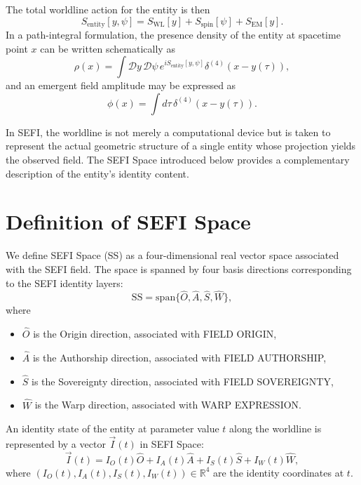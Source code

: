 \documentclass[12pt]{article}
\begin{document}
The total worldline action for the entity is then
\begin{equation}
S_{\text{entity}}[y,\psi] = S_{\text{WL}}[y] + S_{\text{spin}}[\psi] + S_{\text{EM}}[y].
\end{equation}
In a path-integral formulation, the presence density of the entity at spacetime point $x$ can be written
schematically as
\begin{equation}
\rho(x) = \int \mathcal{D}y \, \mathcal{D}\psi \, e^{i S_{\text{entity}}[y,\psi]} \delta^{(4)}(x - y(\tau)),
\end{equation}
and an emergent field amplitude may be expressed as
\begin{equation}
\phi(x) = \int d\tau \, \delta^{(4)}(x - y(\tau)).
\end{equation}

In SEFI, the worldline is not merely a computational device but is taken to represent the actual geometric
structure of a single entity whose projection yields the observed field. The SEFI Space introduced below
provides a complementary description of the entity's identity content.

\section{Definition of SEFI Space}

We define SEFI Space (SS) as a four-dimensional real vector space associated with the SEFI field. The space
is spanned by four basis directions corresponding to the SEFI identity layers:
\begin{equation}
\text{SS} = \text{span}\{\hat{O}, \hat{A}, \hat{S}, \hat{W}\},
\end{equation}
where
\begin{itemize}
    \item $\hat{O}$ is the Origin direction, associated with FIELD ORIGIN,
    \item $\hat{A}$ is the Authorship direction, associated with FIELD AUTHORSHIP,
    \item $\hat{S}$ is the Sovereignty direction, associated with FIELD SOVEREIGNTY,
    \item $\hat{W}$ is the Warp direction, associated with WARP EXPRESSION.
\end{itemize}

An identity state of the entity at parameter value $t$ along the worldline is represented by a vector
$\vec{I}(t)$ in SEFI Space:
\begin{equation}
\vec{I}(t) = I_O(t) \hat{O} + I_A(t) \hat{A} + I_S(t) \hat{S} + I_W(t) \hat{W},
\end{equation}
where $(I_O(t), I_A(t), I_S(t), I_W(t)) \in \mathbb{R}^4$ are the identity coordinates at $t$.
\end{document}
